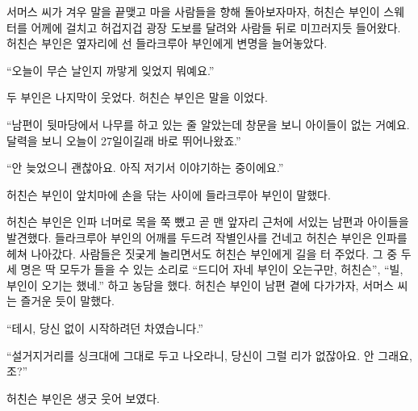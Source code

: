 \documentclass{translation}
\begin{document}
서머스 씨가 겨우 말을 끝맺고 마을 사람들을 향해 돌아보자마자, 허친슨 부인이 스웨터를 어께에 걸치고 허겁지겁 광장 도보를 달려와 사람들 뒤로 미끄러지듯 들어왔다.
허친슨 부인은 옆자리에 선 들라크루아 부인에게 변명을 늘어놓았다.\par
``오늘이 무슨 날인지 까맣게 잊었지 뭐예요.''\par
두 부인은 나지막이 웃었다.
허친슨 부인은 말을 이었다.\par
``남편이 뒷마당에서 나무를 하고 있는 줄 알았는데 창문을 보니 아이들이 없는 거예요. 달력을 보니 오늘이 27일이길래 바로 뛰어나왔죠.''\par
``안 늦었으니 괜찮아요. 아직 저기서 이야기하는 중이에요.''\par
허친슨 부인이 앞치마에 손을 닦는 사이에 들라크루아 부인이 말했다.
% 

허친슨 부인은 인파 너머로 목을 쭉 뺐고 곧 맨 앞자리 근처에 서있는 남편과 아이들을 발견했다.
들라크루아 부인의 어깨를 두드려 작별인사를 건네고 허친슨 부인은 인파를 헤쳐 나아갔다.
사람들은 짓궂게 놀리면서도 허친슨 부인에게 길을 터 주었다.
그 중 두세 명은 딱 모두가 들을 수 있는 소리로 ``드디어 자네 부인이 오는구만, 허친슨'', ``빌, 부인이 오기는 했네.'' 하고 농담을 했다.
허친슨 부인이 남편 곁에 다가가자, 서머스 씨는 즐거운 듯이 말했다.\par
``테시, 당신 없이 시작하려던 차였습니다.''\par
``설거지거리를 싱크대에 그대로 두고 나오라니, 당신이 그럴 리가 없잖아요. 안 그래요, 조?''\par
허친슨 부인은 생긋 웃어 보였다.
% 
\end{document}
